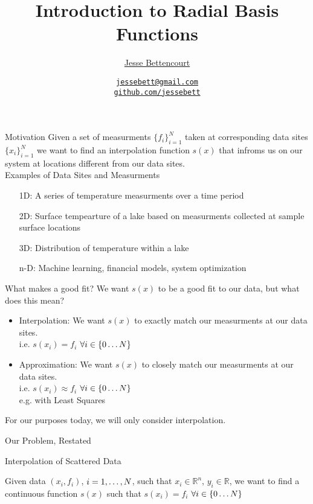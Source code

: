 \documentclass[12pt,t]{beamer}
\title{Introduction to Radial Basis Functions}
\subtitle{}
\author{\href{https://github.com/jessebett/}{Jesse Bettencourt}}
\institute{\href{}{McMaster University}}
\date{\href{jessebett@gmail.com}{\tt \scriptsize jessebett@gmail.com}
\\[-4pt]
\href{http://github.com/jessebett}{\tt \scriptsize github.com/jessebett}
}
\newcommand{\bi}{\begin{itemize}}
\newcommand{\ei}{\end{itemize}}
\newcommand{\subt}[1]{{\footnotesize \color{subtitle} {#1}}}
\begin{document}
{
\frame{
  \titlepage
  \note{}} } 

\begin{frame}{Motivation}
Given a set of measurments \subt{$\{f_i\}_{i=1}^N$}
taken at corresponding data sites \subt{$\{x_i\}_{i=1}^N$}
we want to find an interpolation function \subt{$s(x)$}
that infroms us on our system at locations different from our data sites.\\


\subt{Examples of Data Sites and Measurments}
\begin{itemize}
\item[1D:] A series of temperature measurments over a time period
\item[2D:] Surface tempearture of a lake based on measurments collected at sample surface locations 
\item[3D:] Distribution of temperature within a lake
\item[n-D:] Machine learning, financial models, system optimization
\end{itemize}

\note{}
\end{frame}

\begin{frame}{What makes a good fit?}
We want $s(x)$ to be a good fit to our data, but what does this mean?
\bi
\item Interpolation: We want $s(x)$ to \subt{exactly match} our measurments at our data sites. \\ 
i.e. $s(x_i)=f_i$ $\forall i\in\{0 \mathellipsis N \}$
\item Approximation: We want $s(x)$ to \subt{closely match} our measurments at our data sites.\\
i.e. $s(x_i)\approx f_i$ $\forall i\in\{0 \mathellipsis N \}$ \\
e.g. with Least Squares 
\ei

For our purposes today, we will only consider interpolation.

\note{}
\end{frame}

\begin{frame}[c]{Our Problem, Restated}

\subt{Interpolation of Scattered Data}

Given data $(x_i,f_i)$, $i=1, \mathellipsis, N$, such that $x_i \in \mathbb{R}^n$, $y_i \in \mathbb{R}$, we want to find a continuous function $s(x)$ such that $s(x_i)=f_i$ $\forall i\in\{0 \mathellipsis N \}$


\note{}
\end{frame}
\end{document}
